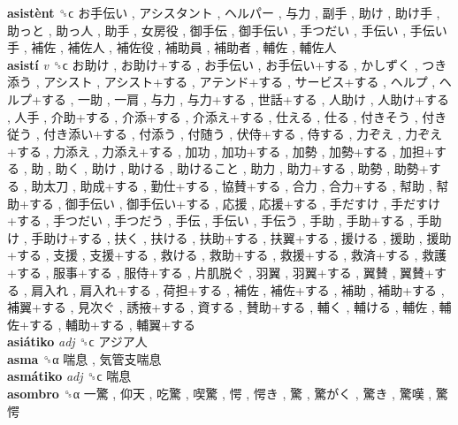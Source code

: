 \textbf{asistènt} ␝ϲ   お手伝い ,  アシスタント ,  ヘルパー ,  与力 ,  副手 ,  助け ,  助け手 ,  助っと ,  助っ人 ,  助手 ,  女房役 ,  御手伝 ,  御手伝い ,  手つだい ,  手伝い ,  手伝い手 ,  補佐 ,  補佐人 ,  補佐役 ,  補助員 ,  補助者 ,  輔佐 ,  輔佐人   \\
\textbf{asistí} \emph{v}  ␝ϲ   お助け ,  お助け+する ,  お手伝い ,  お手伝い+する ,  かしずく ,  つき添う ,  アシスト ,  アシスト+する ,  アテンド+する ,  サービス+する ,  ヘルプ ,  ヘルプ+する ,  一助 ,  一肩 ,  与力 ,  与力+する ,  世話+する ,  人助け ,  人助け+する ,  人手 ,  介助+する ,  介添+する ,  介添え+する ,  仕える ,  仕る ,  付きそう ,  付き従う ,  付き添い+する ,  付添う ,  付随う ,  伏侍+する ,  侍する ,  力ぞえ ,  力ぞえ+する ,  力添え ,  力添え+する ,  加功 ,  加功+する ,  加勢 ,  加勢+する ,  加担+する ,  助 ,  助く ,  助け ,  助ける ,  助けること ,  助力 ,  助力+する ,  助勢 ,  助勢+する ,  助太刀 ,  助成+する ,  勤仕+する ,  協賛+する ,  合力 ,  合力+する ,  幇助 ,  幇助+する ,  御手伝い ,  御手伝い+する ,  応援 ,  応援+する ,  手だすけ ,  手だすけ+する ,  手つだい ,  手つだう ,  手伝 ,  手伝い ,  手伝う ,  手助 ,  手助+する ,  手助け ,  手助け+する ,  扶く ,  扶ける ,  扶助+する ,  扶翼+する ,  援ける ,  援助 ,  援助+する ,  支援 ,  支援+する ,  救ける ,  救助+する ,  救援+する ,  救済+する ,  救護+する ,  服事+する ,  服侍+する ,  片肌脱ぐ ,  羽翼 ,  羽翼+する ,  翼賛 ,  翼賛+する ,  肩入れ ,  肩入れ+する ,  荷担+する ,  補佐 ,  補佐+する ,  補助 ,  補助+する ,  補翼+する ,  見次ぐ ,  誘掖+する ,  資する ,  賛助+する ,  輔く ,  輔ける ,  輔佐 ,  輔佐+する ,  輔助+する ,  輔翼+する   \\
\textbf{asiátiko} \emph{adj}  ␝ϲ   アジア人   \\
\textbf{asma} ␝α   喘息 ,  気管支喘息   \\
\textbf{asmátiko} \emph{adj}  ␝ϲ   喘息   \\
\textbf{asombro} ␝α   一驚 ,  仰天 ,  吃驚 ,  喫驚 ,  愕 ,  愕き ,  驚 ,  驚がく ,  驚き ,  驚嘆 ,  驚愕   \\
